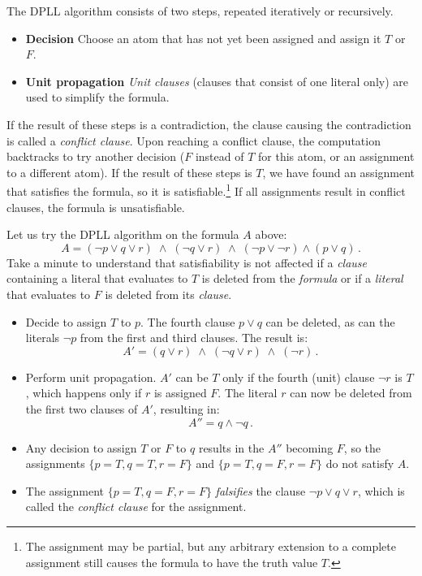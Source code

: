 \documentclass[11pt,a4paper]{article}
\newcommand*{\ngg}{\mathop{\neg}}
\begin{document}
The DPLL algorithm consists of two steps, repeated iteratively or recursively.
\begin{itemize}
\item \textbf{Decision} Choose an atom that has not yet been assigned and assign it $T$ or $F$.
\item \textbf{Unit propagation} \emph{Unit clauses} (clauses that consist of one literal only) are used to simplify the formula.
\end{itemize}
If the result of these steps is a contradiction, the clause causing the contradiction is called a \emph{conflict clause}. Upon reaching a conflict clause, the computation backtracks to try another decision ($F$ instead of $T$ for this atom, or an assignment to a different atom). If the result of these steps is $T$, we have found an assignment that satisfies the formula, so it is satisfiable.\footnote{The assignment may be partial, but any arbitrary extension to a complete assignment still causes the formula to have the truth value $T$.} If all assignments result in conflict clauses, the formula is unsatisfiable.

Let us try the DPLL algorithm on the formula $A$ above:
\[
A=(\ngg p \vee q \vee r) \;\wedge\; (\ngg q \vee r) \;\wedge\; (\ngg p \vee\ngg r) \wedge (p \vee q)\,.
\]
Take a minute to understand that satisfiability is not affected if a \emph{clause} containing a literal that evaluates to $T$ is deleted from the \emph{formula} or if a \emph{literal} that evaluates to $F$ is deleted from its \emph{clause}.
\begin{itemize}
\item Decide to assign $T$ to $p$. The fourth clause $p \vee q$ can be deleted, as can the literals $\ngg p$ from the first and third clauses. The result is:
\[
A'=(q \vee r) \;\wedge\; (\ngg q \vee r) \;\wedge\; (\ngg r)\,.
\]
\item Perform unit propagation. $A'$ can be $T$ only if the fourth (unit) clause $\ngg r$ is $T$, which happens only if $r$ is assigned $F$. The literal $r$ can now be deleted from the first two clauses of $A'$, resulting in:
\[
A'' = q \wedge \ngg q\,.
\]
\item Any decision to assign $T$ or $F$ to $q$ results in the $A''$ becoming $F$, so the assignments $\{p=T, q=T, r=F\}$ and $\{p=T, q=F, r=F\}$ do not satisfy $A$.
\item The assignment $\{p=T, q=F, r=F\}$ \emph{falsifies} the clause $\ngg p \vee q \vee r$, which is called the \emph{conflict clause} for the assignment.
\end{itemize}
\end{document}
